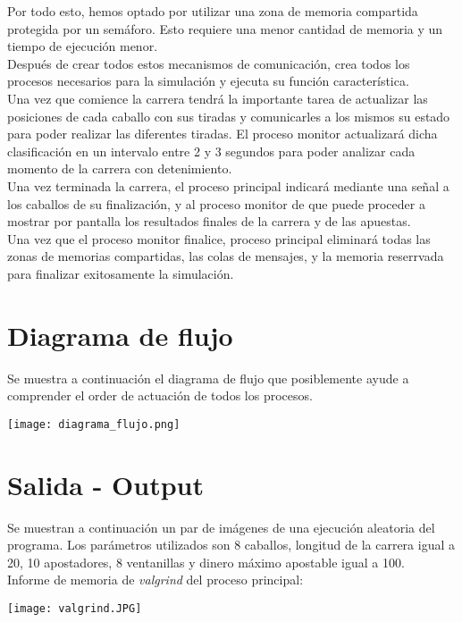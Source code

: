 \documentclass[12pt]{article}
\begin{document}
Por todo esto, hemos optado por utilizar una zona de memoria compartida protegida por un semáforo. Esto requiere una menor cantidad de memoria y un tiempo de ejecución menor.\\

Después de crear todos estos mecanismos de comunicación, crea todos los procesos necesarios para la simulación y ejecuta su función característica.\\

Una vez que comience la carrera tendrá la importante tarea de actualizar las posiciones de cada caballo con sus tiradas y comunicarles a los mismos su estado para poder realizar las diferentes tiradas. El proceso monitor actualizará dicha clasificación en un intervalo entre 2 y 3 segundos para poder analizar cada momento de la carrera con detenimiento.\\

Una vez terminada la carrera, el proceso principal indicará mediante una señal a los caballos de su finalización, y al proceso monitor de que puede proceder a mostrar por pantalla los resultados finales de la carrera y de las apuestas.\\

Una vez que el proceso monitor finalice, proceso principal eliminará todas las zonas de memorias compartidas, las colas de mensajes, y la memoria reserrvada para finalizar exitosamente la simulación.\\

\newpage
\section{Diagrama de flujo}
Se muestra a continuación el diagrama de flujo que posiblemente ayude a comprender el order de actuación de todos los procesos.
\begin{center}
	\texttt{[image: diagrama\_flujo.png]}
\end{center}

\section{Salida - Output}
Se muestran a continuación un par de imágenes de una ejecución aleatoria del programa. Los parámetros utilizados son 8 caballos, longitud de la carrera igual a 20, 10 apostadores, 8 ventanillas y dinero máximo apostable igual a 100.\\

Informe de memoria de \emph{valgrind} del proceso principal:
\begin{center}
	\texttt{[image: valgrind.JPG]}
\end{center}
\end{document}
